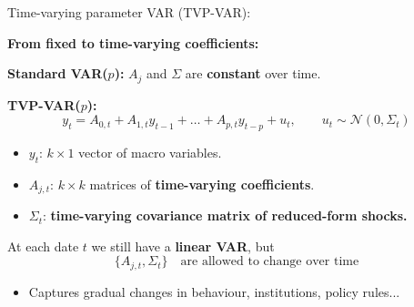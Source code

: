 \documentclass{beamer}
\begin{document}
\begin{frame}{Time-varying parameter VAR (TVP-VAR):}
\small

\textbf{From fixed to time-varying coefficients:}

\medskip
\textbf{Standard VAR($p$):} $A_j$ and $\Sigma$ are \textbf{constant} over time.

\textbf{TVP-VAR($p$):}
\[
y_t = A_{0,t} + A_{1,t} y_{t-1} + \dots + A_{p,t} y_{t-p} + u_t,
\qquad u_t \sim \mathcal{N}(0,\Sigma_t)
\]

\begin{itemize}
  \item $y_t$: $k \times 1$ vector of macro variables.
  \item $A_{j,t}$: $k \times k$ matrices of \textbf{time-varying coefficients}.
  \item $\Sigma_t$: \textbf{time-varying covariance matrix of reduced-form shocks.}
\end{itemize}

At each date $t$ we still have a \textbf{linear VAR}, but
\[
\{A_{j,t}, \Sigma_t\} \quad \text{are allowed to change over time}
\]

\begin{itemize}
  \item Captures gradual changes in behaviour, institutions, policy rules...
\end{itemize}

\end{frame}
\end{document}
